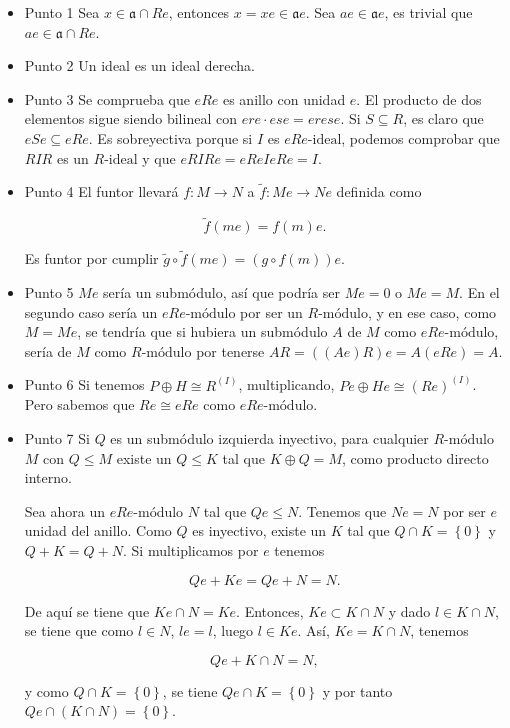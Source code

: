 \documentclass[11pt]{article}
\begin{document}
\begin{itemize}
\item Punto 1
\label{sec-7-4-7-1}
Sea $x \in \mathfrak{a} \cap Re$, entonces $x = xe \in \mathfrak{a}e$. Sea $ae \in \mathfrak{a}e$, es trivial que $ae \in \mathfrak{a} \cap Re$.

\item Punto 2
\label{sec-7-4-7-2}
Un ideal es un ideal derecha.

\item Punto 3
\label{sec-7-4-7-3}
Se comprueba que $eRe$ es anillo con unidad $e$. El producto de dos elementos
sigue siendo bilineal con $ere \cdot ese = erese$. Si $S \subseteq R$, es claro que $eSe \subseteq eRe$.
Es sobreyectiva porque si $I$ es $eRe\text{-ideal}$, podemos comprobar que $RIR$ es un
$R\text{-ideal}$ y que $eRIRe = eReIeRe = I$.

\item Punto 4
\label{sec-7-4-7-4}
El funtor llevará $f \colon M \to N$ a $\widetilde f \colon Me \to Ne$ definida como

\[\widetilde f(me) = f(m)e.\]

Es funtor por cumplir $\widetilde g \circ \widetilde f (me) = (g \circ f(m))e$.

\item Punto 5
\label{sec-7-4-7-5}
$Me$ sería un submódulo, así que podría ser $Me = 0$ o $Me = M$.
En el segundo caso sería un $eRe\text{-módulo}$ por ser un $R\text{-módulo}$,
y en ese caso, como $M = Me$, se tendría que si hubiera un
submódulo $A$ de $M$ como $eRe\text{-módulo}$, sería de $M$ como $R\text{-módulo}$
por tenerse $AR = ((Ae)R)e = A(eRe) = A$.

\item Punto 6
\label{sec-7-4-7-6}
Si tenemos $P \oplus H \cong R^{(I)}$, multiplicando, $Pe \oplus He \cong (Re)^{(I)}$. Pero
sabemos que $Re \cong eRe$ como $eRe\text{-módulo}$.

\item Punto 7
\label{sec-7-4-7-7}
Si $Q$ es un submódulo izquierda inyectivo, para cualquier $R\text{-módulo}$ $M$
con $Q \leq M$ existe un $Q \leq K$ tal que $K \oplus Q = M$, como producto directo
interno.

Sea ahora un $eRe\text{-módulo}$ $N$ tal que $Qe \leq N$. Tenemos que $Ne = N$ por
ser $e$ unidad del anillo. Como $Q$ es inyectivo, existe un $K$ tal que
$Q \cap K = \left\{ 0 \right\}$ y $Q + K = Q + N$. Si multiplicamos por $e$ tenemos

\[
Qe + Ke = Qe + N = N.
\]

De aquí se tiene que $Ke \cap N = Ke$. Entonces, $Ke \subset K \cap N$ y dado $l \in K \cap N$,
se tiene que como $l \in N$, $le=l$, luego $l \in Ke$. Así, $Ke = K \cap N$, tenemos

\[
Qe + K \cap N = N,
\]

y como $Q \cap K = \left\{ 0 \right\}$, se tiene $Qe \cap K = \left\{ 0 \right\}$ y por tanto $Qe \cap (K\cap N) = \left\{ 0 \right\}$.
\end{itemize}
\end{document}
